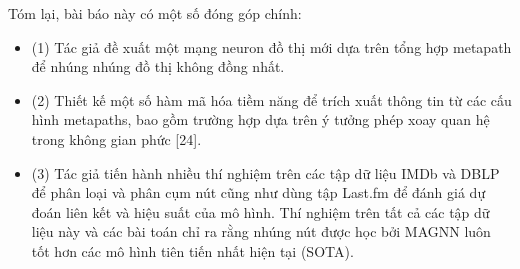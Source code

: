 Tóm lại, bài báo này có một số đóng góp chính:
\begin{itemize}
  \item[] (1) Tác giả đề xuất một mạng neuron đồ thị mới  dựa trên tổng hợp metapath để nhúng nhúng đồ thị không đồng nhất.
  \item[] (2) Thiết kế một số hàm mã hóa tiềm năng để trích xuất thông tin từ các cấu hình metapaths, bao gồm trường hợp dựa trên ý tưởng phép xoay quan hệ trong không gian phức [24].
  \item[] (3) Tác giả tiến hành nhiều thí nghiệm trên các tập dữ liệu IMDb và DBLP để phân loại và phân cụm nút cũng như dùng tập Last.fm để đánh giá dự đoán liên kết và hiệu suất của mô hình. Thí nghiệm trên tất cả các tập dữ liệu này và các bài toán chỉ ra rằng nhúng nút được học bởi MAGNN luôn tốt hơn các mô hình tiên tiến nhất hiện tại (SOTA).
\end{itemize}

